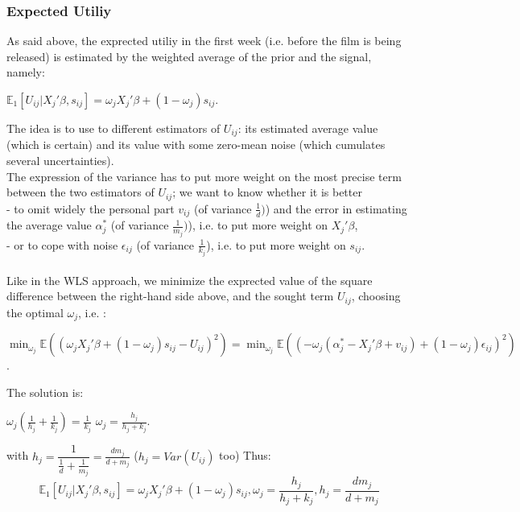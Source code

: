 	\subsubsection{Expected Utiliy}
	As said above, the exprected utiliy in the first week (i.e. before the film is being released) is estimated by the weighted average of the prior and the signal, namely:
	\begin{center}
		$\mathbb{E}_1[U_{i j}|X_{j}'\beta, s_{i j}]=\omega_{j} X_{j}'\beta+(1-\omega_{j})s_{i j}$.
	\end{center}
	The idea is to use to different estimators of $U_{i j}$: its estimated average value (which is certain) and its value with some zero-mean noise (which cumulates several uncertainties).\\
	The expression of the variance has to put more weight on the most precise term between the two estimators of $U_{i j}$; we want to know whether it is better \\
	- to omit widely the personal part $v_{i j}$ (of variance $\frac{1}{d})$) and the error in estimating the average value $\alpha_{j}^{*}$ (of variance $\frac{1}{m_{j}})$), i.e. to put more weight on $X_{j}'\beta$,\\
	- or to cope with noise $\epsilon_{i j}$ (of variance $\frac{1}{k_{j}}$), i.e. to put more weight on $s_{i j}$.\\
	\\
	Like in the WLS approach, we minimize the exprected value of the square difference between the right-hand side above, and the sought term $U_{i j}$, choosing the optimal $\omega_{j}$, i.e. :
	\begin{center}
		$\min_{\omega_{j}} \mathbb{E}((\omega_{j} X_{j}'\beta+(1-\omega_{j})s_{i j}-U_{i j})^{2})=\min_{\omega_{j}} \mathbb{E}((-\omega_{j} (\alpha_{j}^{*}-X_{j}'\beta+v_{i j})+(1-\omega_{j})\epsilon_{i j})^{2})$.
	\end{center}
	The solution is:
	\begin{center}
		$\omega_{j}(\frac{1}{h_{j}}+\frac{1}{k_{j}})=\frac{1}{k_{j}}$
		$\omega_j=\frac{h_{j}}{h_{j}+k_{j}}$.
	\end{center}
	with $h_{j}=\dfrac{1}{\frac{1}{d}+\frac{1}{m_{j}}}=\frac{d m_{j}}{d+m_{j}}$ ($h_{j}=Var(U_{i j})$ too)
	Thus:
	\begin{equation}
	\mathbb{E}_1[U_{i j}|X_{j}'\beta, s_{i j}]=\omega_{j} X_{j}'\beta+(1-\omega_{j})s_{i j}, \omega_j=\frac{h_{j}}{h_{j}+k_{j}}, h_{j}=\frac{d m_{j}}{d+m_{j}}
	\end{equation}
	\\
